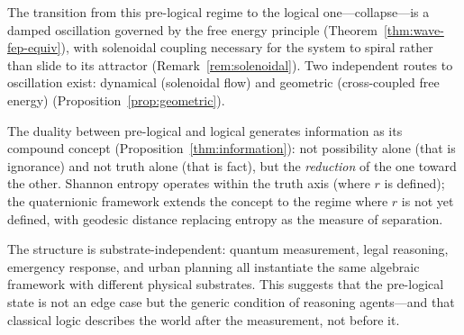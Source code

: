 \documentclass[11pt,a4paper]{article}
\begin{document}
The transition from this pre-logical regime to the logical one---collapse---is
a damped oscillation governed by the free energy principle
(Theorem~\ref{thm:wave-fep-equiv}), with solenoidal coupling necessary
for the system to spiral rather than slide to its attractor
(Remark~\ref{rem:solenoidal}). Two independent routes to oscillation
exist: dynamical (solenoidal flow) and geometric (cross-coupled free
energy) (Proposition~\ref{prop:geometric}).

The duality between pre-logical and logical generates information as its
compound concept (Proposition~\ref{thm:information}): not possibility
alone (that is ignorance) and not truth alone (that is fact), but the
\emph{reduction} of the one toward the other. Shannon entropy operates
within the truth axis (where $r$ is defined); the quaternionic framework
extends the concept to the regime where $r$ is not yet defined, with
geodesic distance replacing entropy as the measure of separation.

The structure is substrate-independent: quantum measurement, legal
reasoning, emergency response, and urban planning all instantiate the
same algebraic framework with different physical substrates. This
suggests that the pre-logical state is not an edge case but the generic
condition of reasoning agents---and that classical logic describes the
world after the measurement, not before it.



\end{document}
